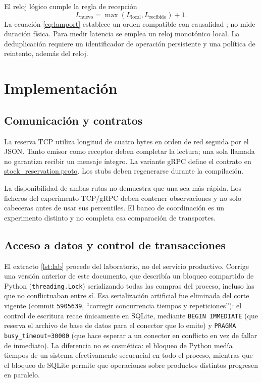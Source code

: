 \documentclass[12pt,a4paper]{article}
\newcommand{\evidencia}[2]{\href{https://github.com/JoseLozanoMorales/TiendaTech/blob/e6680b0290d2c6921ea47116c2df60bd7b055de0/#1}{#2}}
\newcommand{\seccion}[1]{\section{#1}}
\begin{document}
El reloj lógico cumple la regla de recepción
\begin{equation}
L_{\mathrm{nuevo}}=\max(L_{\mathrm{local}},L_{\mathrm{recibido}})+1.
\label{eq:lamport}
\end{equation}
La ecuación \ref{eq:lamport} establece un orden compatible con causalidad \cite{lamport1978}; no mide duración física. Para medir latencia se emplea un reloj monotónico local. La deduplicación requiere un identificador de operación persistente y una política de reintento, además del reloj.

\seccion{Implementación}
\subsection{Comunicación y contratos}
La reserva TCP utiliza longitud de cuatro bytes en orden de red seguida por el JSON. Tanto emisor como receptor deben completar la lectura; una sola llamada no garantiza recibir un mensaje íntegro. La variante gRPC define el contrato en \evidencia{contracts/stock_reservation.proto}{stock\_reservation.proto}. Los stubs deben regenerarse durante la compilación.

La disponibilidad de ambas rutas no demuestra que una sea más rápida. Los ficheros del experimento TCP/gRPC deben contener observaciones y no solo cabeceras antes de usar sus percentiles. El banco de coordinación es un experimento distinto y no completa esa comparación de transportes.

\subsection{Acceso a datos y control de transacciones}
El extracto \ref{lst:lab} procede del laboratorio, no del servicio productivo. Corrige una versión anterior de este documento, que describía un bloqueo compartido de Python (\texttt{threading.Lock}) serializando todas las compras del proceso, incluso las que no conflictuaban entre sí. Esa serialización artificial fue eliminada del corte vigente (commit \texttt{5905639}, ``corregir concurrencia tiempos y repeticiones''): el control de escritura recae únicamente en SQLite, mediante \texttt{BEGIN IMMEDIATE} (que reserva el archivo de base de datos para el conector que lo emite) y \texttt{PRAGMA busy\_timeout=30000} (que hace esperar a un conector en conflicto en vez de fallar de inmediato). La diferencia no es cosmética: el bloqueo de Python medía tiempos de un sistema efectivamente secuencial en todo el proceso, mientras que el bloqueo de SQLite permite que operaciones sobre productos distintos progresen en paralelo.
\end{document}
